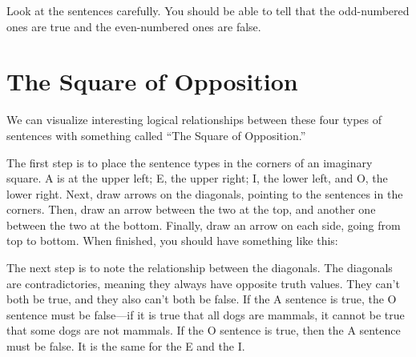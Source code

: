 Look at the sentences carefully. You should be able to tell that the odd-numbered ones are true and the even-numbered ones are false.

\section{The Square of Opposition}
\label{sec:square-opposition}

We can visualize interesting logical relationships between these four types of sentences with something called \enquote{The Square of Opposition.}

The first step is to place the sentence types in the corners of an imaginary square. A is at the upper left; E, the upper right; I, the lower left, and O, the lower right. Next, draw arrows on the diagonals, pointing to the sentences in the corners. Then, draw an arrow between the two at the top, and another one between the two at the bottom. Finally, draw an arrow on each side, going from top to bottom. When finished, you should have something like this:


\medskip
{}

The next step is to note the relationship between the diagonals. The diagonals are contradictories, meaning they always have opposite truth values. They can't both be true, and they also can't both be false.  If the A sentence is true, the O sentence must be false---if it is true that all dogs are mammals, it cannot be true that some dogs are not mammals. If the O sentence is true, then the A sentence must be false. It is the same for the E and the I. 

\medskip
{}

